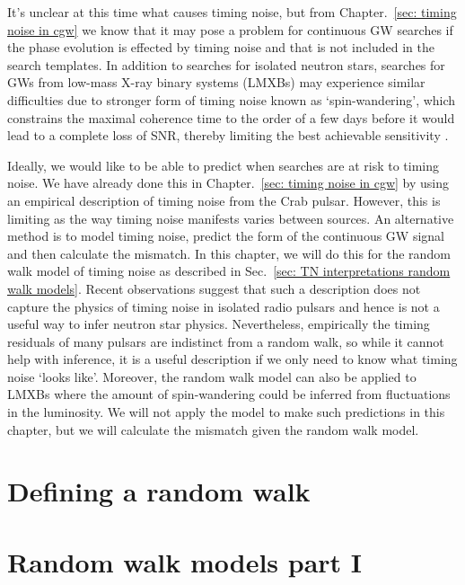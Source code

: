 \documentclass[../full_thesis/full_thesis.tex]{subfiles}
\newcommand{\thisdir}{../analytic_timing_noise_cgw}
\begin{document}
It's unclear at this time what causes timing noise, but from Chapter.~\ref{sec:
timing noise in cgw} we know that it may pose a problem for continuous GW
searches if the phase evolution is effected by timing noise and that is not
included in the search templates. In addition to searches for isolated neutron
stars, searches for GWs from low-mass X-ray binary systems (LMXBs) may
experience similar difficulties due to stronger form of timing noise known as
`spin-wandering', which constrains the maximal coherence time to the order of a
few days before it would lead to a complete loss of SNR, thereby limiting the
best achievable sensitivity \citep[see][for
details]{ligo2015scox1,leaci2015,ScoX1:MDC1}.

Ideally, we would like to be able to predict when searches are at risk to
timing noise.  We have already done this in Chapter.~\ref{sec: timing noise in
cgw} by using an empirical description of timing noise from the Crab pulsar.
However, this is limiting as the way timing noise manifests varies between
sources. An alternative method is to model timing noise, predict the form of
the continuous GW signal and then calculate the mismatch. In this chapter, we
will do this for the random walk model of timing noise as described in
Sec.~\ref{sec: TN interpretations random walk models}.  Recent observations
\citep{Hobbs2010} suggest that such a description does not capture the physics
of timing noise in isolated radio pulsars and hence is not a useful way to
infer neutron star physics. Nevertheless, empirically the timing residuals of
many pulsars are indistinct from a random walk, so while it cannot help with
inference, it is a useful description if we only need to know what timing noise
`looks like'. Moreover, the random walk model can also be applied to LMXBs
where the amount of spin-wandering could be inferred from fluctuations in the
luminosity. We will not apply the model to make such predictions in this
chapter, but we will calculate the mismatch given the random walk model.


\section{Defining a random walk}
\label{sec: Defining a random walk}


\section{Random walk models part I}
\label{sec: Random walk models part I}

\end{document}
